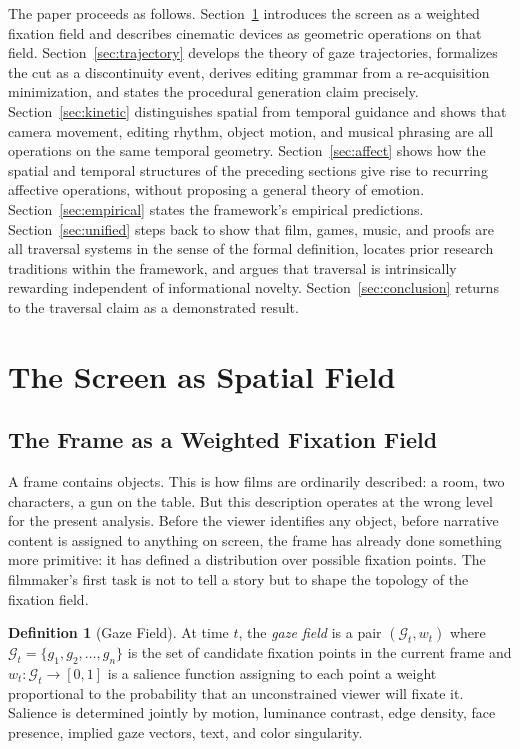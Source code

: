 \documentclass[12pt, a4paper]{article}
\theoremstyle{plain}
\theoremstyle{definition}
\newtheorem{definition}[theorem]{Definition}
\theoremstyle{remark}
\newcommand{\G}{\mathcal{G}}
\newcommand{\salience}{w}
\begin{document}
The paper proceeds as follows. Section~\ref{sec:spatial}
introduces the screen as a weighted fixation field and
describes cinematic devices as geometric operations on that
field. Section~\ref{sec:trajectory} develops the theory of
gaze trajectories, formalizes the cut as a discontinuity
event, derives editing grammar from a re-acquisition
minimization, and states the procedural generation claim
precisely. Section~\ref{sec:kinetic} distinguishes spatial
from temporal guidance and shows that camera movement,
editing rhythm, object motion, and musical phrasing are all
operations on the same temporal geometry. Section~\ref{sec:affect}
shows how the spatial and temporal structures of the
preceding sections give rise to recurring affective
operations, without proposing a general theory of emotion.
Section~\ref{sec:empirical} states the framework's empirical
predictions. Section~\ref{sec:unified} steps back to show
that film, games, music, and proofs are all traversal
systems in the sense of the formal definition, locates prior
research traditions within the framework, and argues that
traversal is intrinsically rewarding independent of
informational novelty. Section~\ref{sec:conclusion} returns
to the traversal claim as a demonstrated result.

\section{The Screen as Spatial Field}
\label{sec:spatial}

\subsection{The Frame as a Weighted Fixation Field}
\label{subsec:frame}

A frame contains objects. This is how films are ordinarily
described: a room, two characters, a gun on the table. But
this description operates at the wrong level for the present
analysis. Before the viewer identifies any object, before
narrative content is assigned to anything on screen, the
frame has already done something more primitive: it has
defined a distribution over possible fixation points. The
filmmaker's first task is not to tell a story but to shape
the topology of the fixation field.

\begin{definition}[Gaze Field]
  At time $t$, the \emph{gaze field} is a pair
  $(\G_t, \salience_t)$ where $\G_t = \{g_1, g_2, \ldots,
  g_n\}$ is the set of candidate fixation points in the
  current frame and $\salience_t : \G_t \to [0,1]$ is a
  salience function assigning to each point a weight
  proportional to the probability that an unconstrained
  viewer will fixate it. Salience is determined jointly by
  motion, luminance contrast, edge density, face presence,
  implied gaze vectors, text, and color singularity.
\end{definition}
\end{document}

